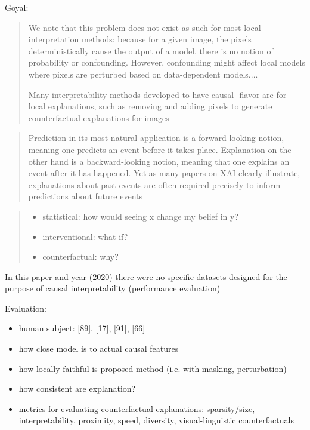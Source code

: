       {
            \color{gray}
            Goyal:
            \begin{quote}
                  We note that this problem does not exist as such for most
                  local interpretation methods: because for a given image,
                  the pixels deterministically cause the output of a model,
                  there is no notion of probability or confounding. However,
                  confounding might affect local models where pixels are perturbed based on data-dependent models....

                  Many interpretability methods developed to have causal-
                  flavor are for local explanations, such as removing and
                  adding pixels to generate counterfactual explanations for
                  images
            \end{quote}
            \begin{quote}
                Prediction in its most natural application is a forward-looking notion, meaning one predicts an event before it takes place. Explanation on the other hand is a backward-looking notion, meaning that one explains an event after it has happened. Yet as many papers on XAI clearly illustrate, explanations about past events are often required precisely to inform predictions about future events
            \end{quote}

            \begin{quote}

                  \begin{itemize}
                        \item statistical: how would seeing x change my belief in y?
                        \item interventional: what if?
                        \item counterfactual: why?
                  \end{itemize}
            \end{quote}

            In this paper and year (2020) there were no specific datasets designed for the purpose of causal interpretability (performance evaluation)

            Evaluation:

            \begin{itemize}
                  \item human subject: [89], [17], [91], [66]
                  \item how close model is to actual causal features
                  \item how locally faithful is proposed method (i.e. with masking, perturbation)
                  \item how consistent are explanation?
                  \item metrics for evaluating counterfactual explanations: sparsity/size, interpretability, proximity, speed, diversity, visual-linguistic counterfactuals
            \end{itemize}
      }
      
